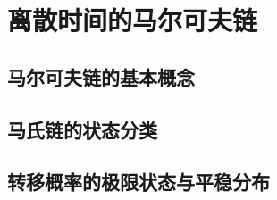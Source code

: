 \section{离散时间的马尔可夫链}
    \subsection{马尔可夫链的基本概念}
    \subsection{马氏链的状态分类}
    \subsection{转移概率的极限状态与平稳分布}
